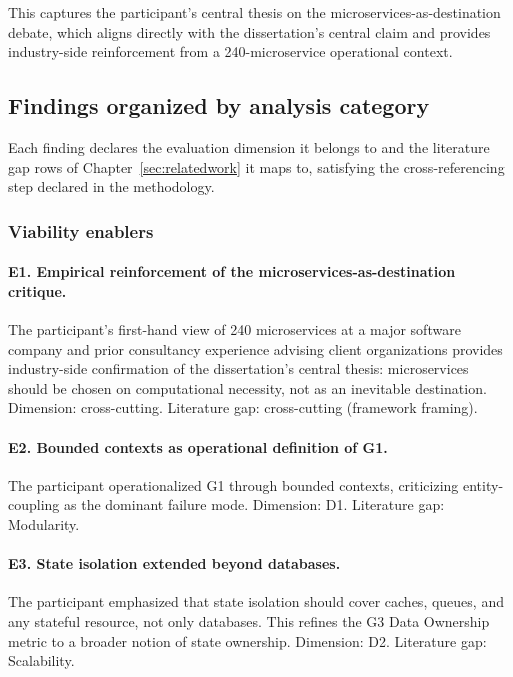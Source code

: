 This captures the participant's central thesis on the microservices-as-destination debate, which aligns directly with the dissertation's central claim and provides industry-side reinforcement from a 240-microservice operational context.

\subsection*{Findings organized by analysis category}

Each finding declares the evaluation dimension it belongs to and the literature gap rows of Chapter~\ref{sec:relatedwork} it maps to, satisfying the cross-referencing step declared in the methodology.

\subsubsection*{Viability enablers}

\paragraph*{E1. Empirical reinforcement of the microservices-as-destination critique.} The participant's first-hand view of 240 microservices at a major software company and prior consultancy experience advising client organizations provides industry-side confirmation of the dissertation's central thesis: microservices should be chosen on computational necessity, not as an inevitable destination. Dimension: cross-cutting. Literature gap: cross-cutting (framework framing).

\paragraph*{E2. Bounded contexts as operational definition of G1.} The participant operationalized G1 through bounded contexts, criticizing entity-coupling as the dominant failure mode. Dimension: D1. Literature gap: Modularity.

\paragraph*{E3. State isolation extended beyond databases.} The participant emphasized that state isolation should cover caches, queues, and any stateful resource, not only databases. This refines the G3 Data Ownership metric to a broader notion of state ownership. Dimension: D2. Literature gap: Scalability.

